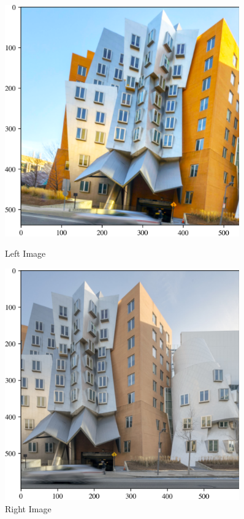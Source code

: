 \documentclass[11pt,a4paper]{article}
\begin{document}
\begin{figure}[ht!]
  \centering
  \begin{minipage}{0.45\textwidth}
    \centering
    \includegraphics[width=0.9\textwidth]{figs/left.png} %
    \caption{Left Image}
  \end{minipage}
  \quad
  \begin{minipage}{0.45\textwidth}
    \centering
    \includegraphics[width=0.9\textwidth]{figs/right.png} %
    \caption{Right Image}
  \end{minipage}
\end{figure}
\end{document}

